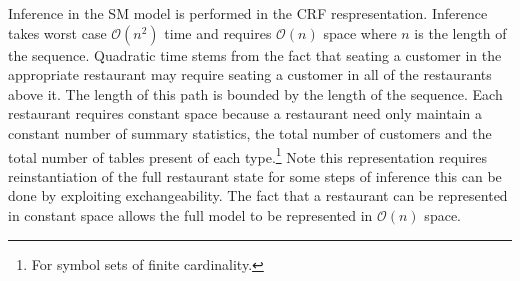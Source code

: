 Inference in the SM model is performed in the CRF respresentation. Inference takes worst case $\mathcal{O}(n^2)$ time and requires $\mathcal{O}(n)$ space where $n$ is the length of the sequence. Quadratic time stems from the fact that seating a customer in the appropriate restaurant may require seating a customer in all of the restaurants above it.  The length of this path is bounded by the length of the sequence. Each restaurant requires constant space because a restaurant need only maintain a constant number of summary statistics, the total number of customers and the total number of tables present of each type.\footnote{For symbol sets of finite cardinality.} Note this representation requires reinstantiation of the full restaurant state for some steps of inference this can be done by exploiting exchangeability.  The fact that a restaurant can be represented in constant space allows the full model to be represented in $\mathcal{O}(n)$ space.

